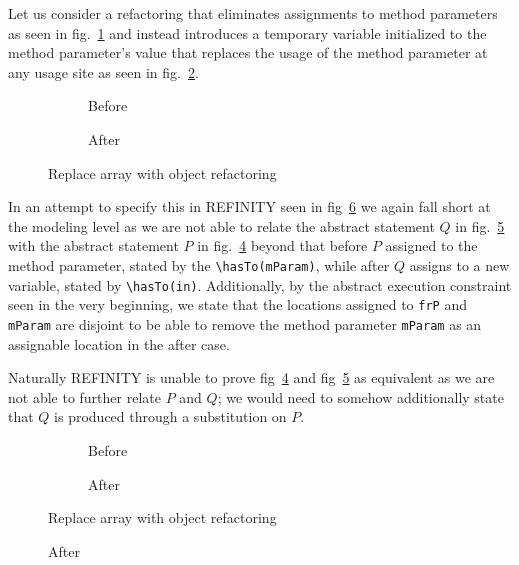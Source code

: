 Let us consider a refactoring that eliminates assignments to method parameters as seen in fig.~\ref{refa:RemoveAssignment-java-before} and instead introduces a temporary variable initialized to the method parameter's value that replaces the usage of the method parameter at any usage site as seen in fig.~\ref{refa:RemoveAssignment-java-after}.

\begin{figure}
  \begin{subfigure}[h]{.45\linewidth}
    
    \caption{Before}
    \label{refa:RemoveAssignment-java-before}    
  \end{subfigure}\hspace{1cm}
  \begin{subfigure}[h]{.45\linewidth}
    
    \caption{After}
    \label{refa:RemoveAssignment-java-after}
  \end{subfigure}
  \caption{Replace array with object refactoring}
  \label{refa:RemovAssignment-java}
\end{figure}

In an attempt to specify this in REFINITY seen in fig~\ref{refa:RemovAssignment-refinity} we again fall short at the modeling level as we are not able to relate the abstract statement $Q$ in fig.~\ref{refa:RemoveAssignment-refinity-after} with the abstract statement $P$ in fig.~\ref{refa:RemoveAssignment-refinity-before} beyond that before $P$ assigned to the method parameter, stated by the \lstinline[style=refinity]|\hasTo(mParam)|, while after $Q$ assigns to a new variable, stated by \lstinline[style=refinity]|\hasTo(in)|. Additionally, by the abstract execution constraint seen in the very beginning, we state that the locations
assigned to \lstinline[style=refinity]|frP| and \lstinline[style=refinity]|mParam| are disjoint to be able to remove the method parameter \lstinline[style=refinity]|mParam| as an assignable location in the after case.

Naturally REFINITY is unable to prove fig~\ref{refa:RemoveAssignment-refinity-before} and fig~\ref{refa:RemoveAssignment-refinity-after} as equivalent
as we are not able to further relate $P$ and $Q$; we would need to somehow additionally state that $Q$ is produced through a substitution on $P$.


\begin{figure}
  \begin{subfigure}[h]{.45\linewidth}
    
    \caption{Before}
    \label{refa:RemoveAssignment-refinity-before}    
  \end{subfigure}\hspace{1cm}
  \begin{subfigure}[h]{.45\linewidth}
    
    \caption{After}
    \label{refa:RemoveAssignment-refinity-after}
  \end{subfigure}
  \caption{Replace array with object refactoring}
  \label{refa:RemovAssignment-refinity}
\end{figure}

